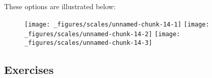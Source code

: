 These options are illustrated below:

\begin{Shaded}
\begin{Highlighting}[]
\StringTok{ }\NormalTok{(} \NormalTok{, } \OperatorTok{:}\NormalTok{, } \OperatorTok{:}\NormalTok{)}
\StringTok{ }\OperatorTok{+}\StringTok{ }\NormalTok{(}\NormalTok{(}

\OperatorTok{+}\StringTok{ }\NormalTok{(} \NormalTok{(} \NormalTok{))}
\OperatorTok{+}\StringTok{ }\NormalTok{(} \NormalTok{(} \NormalTok{(}\NormalTok{, }\NormalTok{)))}
\end{Highlighting}
\end{Shaded}

\begin{figure}[H]
  \texttt{[image: \_figures/scales/unnamed-chunk-14-1]}%
  \texttt{[image: \_figures/scales/unnamed-chunk-14-2]}%
  \texttt{[image: \_figures/scales/unnamed-chunk-14-3]}
\end{figure}

\hypertarget{exercises-2}{%
\subsection{Exercises}\label{exercises-2}}

